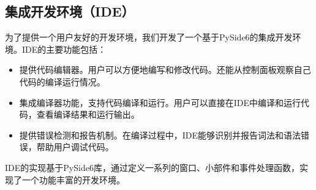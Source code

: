 \documentclass[12pt]{article}
\begin{document}
\subsection{集成开发环境（IDE）}
\quad\quad 
为了提供一个用户友好的开发环境，我们开发了一个基于PySide6的集成开发环境。IDE的主要功能包括：
\begin{itemize}
    \item 提供代码编辑器。用户可以方便地编写和修改代码。还能从控制面板观察自己代码的编译运行情况。
    \item 集成编译器功能，支持代码编译和运行。用户可以直接在IDE中编译和运行代码，查看编译结果和运行输出。
    \item 提供错误检测和报告机制。在编译过程中，IDE能够识别并报告词法和语法错误，帮助用户调试代码。
\end{itemize}

IDE的实现基于PySide6库，通过定义一系列的窗口、小部件和事件处理函数，实现了一个功能丰富的开发环境。
\end{document}
